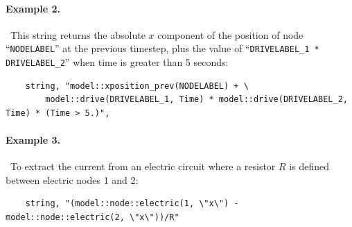 \paragraph{Example 2.} \
This string returns the absolute $x$ component of the position of node ``\verb;NODELABEL;'' at the previous timestep, plus the value of ``\verb;DRIVELABEL_1 * DRIVELABEL_2;'' when time is greater than 5 seconds:
\begin{verbatim}
    string, "model::xposition_prev(NODELABEL) + \
        model::drive(DRIVELABEL_1, Time) * model::drive(DRIVELABEL_2, Time) * (Time > 5.)",
\end{verbatim}

\paragraph{Example 3.} \
To extract the current from an electric circuit where a resistor $R$ is defined between electric nodes 1 and 2:
\begin{verbatim}
    string, "(model::node::electric(1, \"x\") - model::node::electric(2, \"x\"))/R"
\end{verbatim}



